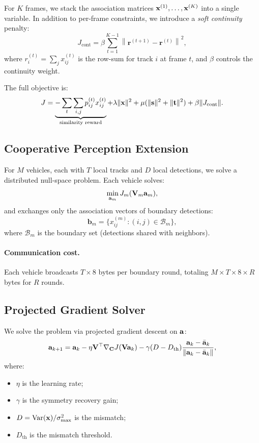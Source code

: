 For $K$ frames, we stack the association matrices 
$\mathbf{x}^{(1)}, \dots, \mathbf{x}^{(K)}$ into a single variable. In addition 
to per-frame constraints, we introduce a \emph{soft continuity} 
penalty:
\begin{equation}
    J_{\text{cont}} = \beta \sum_{t=1}^{K-1} 
    \left\| \mathbf{r}^{(t+1)} - \mathbf{r}^{(t)} \right\|^2,
\end{equation}
where $r_i^{(t)} = \sum_j x_{ij}^{(t)}$ is the row-sum for track $i$ 
at frame $t$, and $\beta$ controls the continuity weight.

The full objective is:
\begin{equation}
    J = \underbrace{-\sum_t \sum_{i,j} p_{ij}^{(t)} x_{ij}^{(t)}}_{
        \text{similarity reward}}
    + \lambda \|\mathbf{x}\|^2 
    + \mu (\|\mathbf{s}\|^2 + \|\mathbf{t}\|^2)
    + \beta \|J_{\text{cont}}\|.
\end{equation}

\subsection{Cooperative Perception Extension}

For $M$ vehicles, each with $T$ local tracks and $D$ local detections, 
we solve a distributed null-space problem. Each vehicle solves:
\begin{equation}
    \min_{\mathbf{a}_m} J_m(\mathbf{V}_m \mathbf{a}_m),
\end{equation}
and exchanges only the association vectors of boundary detections:
\begin{equation}
    \mathbf{b}_m = \{ x_{ij}^{(m)} : (i,j) \in \mathcal{B}_m \},
\end{equation}
where $\mathcal{B}_m$ is the boundary set (detections shared with 
neighbors).

\paragraph{Communication cost.} Each vehicle broadcasts 
$T \times 8$ bytes per boundary round, totaling 
$M \times T \times 8 \times R$ bytes for $R$ rounds.

\subsection{Projected Gradient Solver}

We solve the problem via projected gradient descent on $\mathbf{a}$:
\begin{equation}
    \mathbf{a}_{k+1} = \mathbf{a}_k - \eta \mathbf{V}^\top \nabla_{\mathbf{C}} J(\mathbf{V} \mathbf{a}_k) 
    - \gamma (D - D_{\text{th}}) \frac{\mathbf{a}_k - \bar{\mathbf{a}}_k}{\|\mathbf{a}_k - \bar{\mathbf{a}}_k\|},
\end{equation}
where:
\begin{itemize}[leftmargin=*]
    \item $\eta$ is the learning rate;
    \item $\gamma$ is the symmetry recovery gain;
    \item $D = \mathrm{Var}(\mathbf{x}) / \sigma_{\max}^2$ is the mismatch;
    \item $D_{\text{th}}$ is the mismatch threshold.
\end{itemize}


